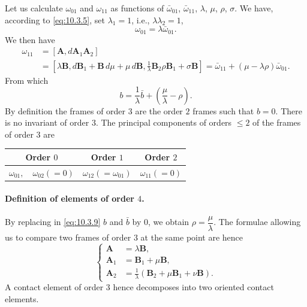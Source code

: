 \documentclass[leqno,11pt]{book}
\numberwithin{equation}{chapter}
\theoremstyle{shape1}
\theoremstyle{shapesmall}
\begin{document}
Let us calculate $\omega_{01}$ and $\omega_{11}$ as functions of $\bar\omega_{01}$, $\bar\omega_{11}$, $\lambda$, $\mu$, $\rho$, $\sigma$. We have, according to \eqref{eq:10.3.5}, set $\lambda_{1}=1$, i.e., $\lambda\lambda_{2}=1$,
\begin{equation}
  \label{eq:10.3.8}
  \omega_{01}=\lambda\bar\omega_{01}.
\end{equation}
We then have
\begin{align*}
  \omega_{11}&=[\mathbf{A},d\mathbf{A}_{1}\mathbf{A}_{2}]\\
  &=\left[\lambda\mathbf{B},d\mathbf{B}_{1}+\mathbf{B}\,d\mu+\mu\,d\mathbf{B},\frac{1}{\lambda}\mathbf{B}_{2}\rho\mathbf{B}_{1}+\sigma\mathbf{B}\right]=\bar\omega_{11}+(\mu-\lambda\rho)\bar\omega_{01}.
\end{align*}
From which
\begin{equation}
  \label{eq:10.3.9}
  b=\frac{1}{\lambda}\bar b+\left(\frac{\mu}{\lambda}-\rho\right).
\end{equation}
By definition the frames of order $3$ are the order $2$ frames such that $b=0$. There is no invariant of order $3$. The principal components of orders $\le 2$ of the frames of order $3$ are
\begin{center}  
  \begin{tabular}{|c|c|c|}
    \hline
    Order $0$&Order $1$&Order $2$\\
    \hline
    $\omega_{01},\quad\omega_{02}(=0)$&$\omega_{12}(=\omega_{01})$&$\omega_{11}(=0)$\\
    \hline
  \end{tabular}
\end{center}

\paragraph{Definition of elements of order $4$.}
\label{sec:145}
By replacing in \eqref{eq:10.3.9} $b$ and $\bar b$ by $0$, we obtain $\rho=\dfrac{\mu}{\lambda}$. The formulae allowing us to compare two frames of order $3$ at the same point are hence
\begin{equation}
  \label{eq:10.3.10}
  \left\{
    \begin{aligned}
      \mathbf{A}_{\phantom{0}}&=\lambda\mathbf{B},\\
      \mathbf{A}_{1}&=\mathbf{B}_{1}+\mu\mathbf{B},\\      
      \mathbf{A}_{2}&=\frac{1}{\lambda}(\mathbf{B}_{2}+\mu\mathbf{B}_{1}+\nu\mathbf{B}).      
    \end{aligned}
  \right.
\end{equation}
A contact element of order $3$ hence decomposes into two oriented contact elements.
\end{document}
